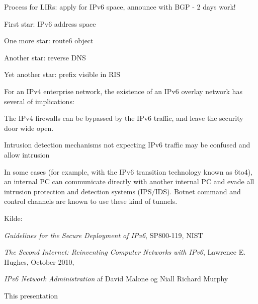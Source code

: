\documentclass[28pt,landscape,a4paper,footrule]{foils}
\begin{document}
\vskip 2cm
\centerline{Process for LIRs: apply for IPv6 space, announce with BGP - 2 days work!}



\begin{list1}
\item First star: IPv6 address space
\item One more star: route6 object
\item Another star: reverse DNS
\item Yet another star: prefix visible in RIS
\end{list1}





\begin{list1}
\item For an IPv4 enterprise network, the existence of an IPv6 overlay network has several of implications:
\begin{list2}
\item The IPv4 firewalls can be bypassed by the IPv6 traffic, and leave the security door wide open.
\item Intrusion detection mechanisms not expecting IPv6 traffic may be confused and allow intrusion
\item In some cases (for example, with the IPv6 transition technology known as 6to4), an internal PC can communicate directly with another internal PC and evade all intrusion protection and detection systems (IPS/IDS). Botnet command and control channels are known to use these kind of tunnels.
\end{list2}
\end{list1}

Kilde:\\
{\footnotesize{}}



\begin{list1}
\item \emph{Guidelines for the Secure Deployment of IPv6}, SP800-119, NIST\\
\item \emph{The Second Internet: Reinventing Computer Networks with IPv6}, Lawrence E. Hughes, October 2010,\\ 
\item \emph{IPv6 Network Administration}
af David Malone og Niall Richard Murphy
\item {}
\item This presentation \smiley
\end{list1}
\end{document}
